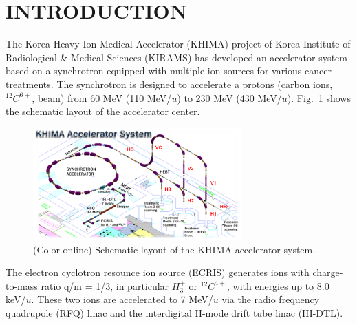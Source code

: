 \documentclass[jkps,preprint,fleqn,showpacs,showkeys,10pt,twocolumn]{revtex4}
\begin{document}

\maketitle


\section{INTRODUCTION}
The Korea Heavy Ion Medical Accelerator (KHIMA) project of Korea Institute of Radiological \& Medical Sciences (KIRAMS) 
has developed an accelerator system based on a synchrotron equipped with multiple ion sources for various cancer treatments.
The synchrotron is designed to accelerate a protons (carbon ions, $^{12}C^{6+}$, beam) 
from 60 MeV (110 MeV/$u$) to 230 MeV (430 MeV/$u$). %
Fig.~\ref{fig0} shows the schematic layout of the accelerator center. 
\begin{figure}[h]
  \begin{center}
    \includegraphics[width=8.0cm]{Fig01.png}
    \caption{(Color online) Schematic layout of the KHIMA accelerator system.}
    \label{fig0}
  \end{center}
\end{figure}
The electron cyclotron resounce ion source (ECRIS) generates ions with charge-to-mass ratio q/m = 1/3, in particular $H^{+}_{3}$ or $^{12}C^{4+}$, 
with energies up to 8.0 keV/$u$. 
These two ions are accelerated to 7 MeV/$u$ via the radio frequency quadrupole (RFQ) linac and the interdigital H-mode drift tube linac (IH-DTL). 
\end{document}
